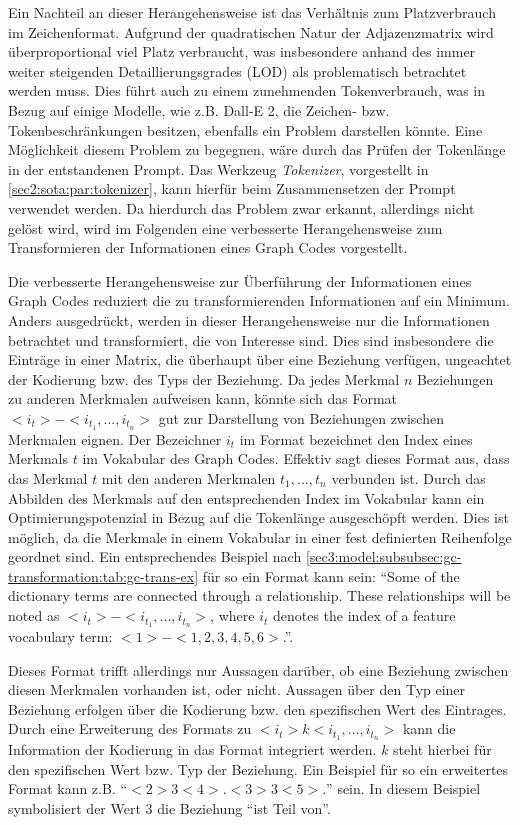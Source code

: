 Ein Nachteil an dieser Herangehensweise ist das Verhältnis zum Platzverbrauch im Zeichenformat.
Aufgrund der quadratischen Natur der Adjazenzmatrix wird überproportional viel Platz verbraucht, was insbesondere anhand des immer weiter steigenden Detaillierungsgrades (LOD) als problematisch betrachtet werden muss.
Dies führt auch zu einem zunehmenden Tokenverbrauch, was in Bezug auf einige Modelle, wie z.B. Dall-E 2, die Zeichen- bzw. Tokenbeschränkungen besitzen, ebenfalls ein Problem darstellen könnte.
Eine Möglichkeit diesem Problem zu begegnen, wäre durch das Prüfen der Tokenlänge in der entstandenen Prompt.
Das Werkzeug \textit{Tokenizer}, vorgestellt in \cref{sec2:sota:par:tokenizer}, kann hierfür beim Zusammensetzen der Prompt verwendet werden.
Da hierdurch das Problem zwar erkannt, allerdings nicht gelöst wird, wird im Folgenden eine verbesserte Herangehensweise zum Transformieren der Informationen eines Graph Codes vorgestellt.

Die verbesserte Herangehensweise zur Überführung der Informationen eines Graph Codes reduziert die zu transformierenden Informationen auf ein Minimum.
Anders ausgedrückt, werden in dieser Herangehensweise nur die Informationen betrachtet und transformiert, die von Interesse sind.
Dies sind insbesondere die Einträge in einer Matrix, die überhaupt über eine Beziehung verfügen, ungeachtet der Kodierung bzw. des Typs der Beziehung.
Da jedes Merkmal $n$ Beziehungen zu anderen Merkmalen aufweisen kann, könnte sich das Format $<i_{t}> - <i_{t_{1}},...,i_{t_{n}}>$ gut zur Darstellung von Beziehungen zwischen Merkmalen eignen.
Der Bezeichner $i_{t}$ im Format bezeichnet den Index eines Merkmals $t$ im Vokabular des Graph Codes.
Effektiv sagt dieses Format aus, dass das Merkmal $t$ mit den anderen Merkmalen $t_1,...,t_n$ verbunden ist.
Durch das Abbilden des Merkmals auf den entsprechenden Index im Vokabular kann ein Optimierungspotenzial in Bezug auf die Tokenlänge ausgeschöpft werden.
Dies ist möglich, da die Merkmale in einem Vokabular in einer fest definierten Reihenfolge geordnet sind.
Ein entsprechendes Beispiel nach \cref{sec3:model:subsubsec:gc-transformation:tab:gc-trans-ex} für so ein Format kann sein: \enquote{Some of the dictionary terms are connected through a relationship. These relationships will be noted as $<i_{t}> - <i_{t_{1}},...,i_{t_{n}}>$, where $i_{t}$ denotes the index of a feature vocabulary term: $<1> - <1,2,3,4,5,6>$.}.

Dieses Format trifft allerdings nur Aussagen darüber, ob eine Beziehung zwischen diesen Merkmalen vorhanden ist, oder nicht.
Aussagen über den Typ einer Beziehung erfolgen über die Kodierung bzw. den spezifischen Wert des Eintrages.
Durch eine Erweiterung des Formats zu $<i_{t}> k <i_{t_1},...,i_{t_n}>$ kann die Information der Kodierung in das Format integriert werden.
$k$ steht hierbei für den spezifischen Wert bzw. Typ der Beziehung.
Ein Beispiel für so ein erweitertes Format kann z.B. \enquote{$<2> 3 <4>. <3> 3 <5>.$} sein.
In diesem Beispiel symbolisiert der Wert 3 die Beziehung \enquote{ist Teil von}.

